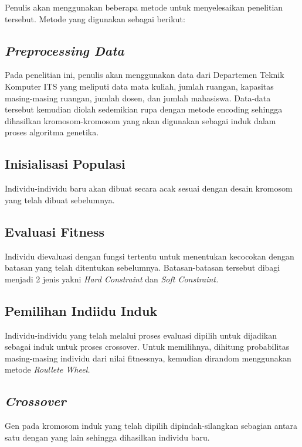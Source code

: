 Penulis akan menggunakan beberapa metode untuk menyelesaikan penelitian tersebut. 
Metode yang digunakan sebagai berikut:

\subsection{\emph{Preprocessing Data}}
  
  Pada penelitian ini, penulis akan menggunakan data dari Departemen Teknik Komputer ITS yang meliputi data mata kuliah, 
  jumlah ruangan, kapasitas masing-masing ruangan, jumlah dosen, dan jumlah mahasiswa. Data-data tersebut kemudian diolah 
  sedemikian rupa dengan metode encoding sehingga dihasilkan kromosom-kromosom yang akan digunakan sebagai induk dalam proses algoritma genetika.
  
\subsection{Inisialisasi Populasi}
  
  Individu-individu baru akan dibuat secara acak sesuai dengan desain kromosom yang telah dibuat sebelumnya.
  
  \subsection{Evaluasi Fitness}
  
  Individu dievaluasi dengan fungsi tertentu untuk menentukan kecocokan dengan batasan yang telah ditentukan sebelumnya. 
  Batasan-batasan tersebut dibagi menjadi 2 jenis yakni \emph{Hard Constraint} dan \emph{Soft Constraint.}
 
  \subsection{Pemilihan Indiidu Induk}
  
  Individu-individu yang telah melalui proses evaluasi dipilih untuk dijadikan sebagai induk untuk proses crossover. 
  Untuk memilihnya, dihitung probabilitas masing-masing individu dari nilai fitnessnya, kemudian dirandom menggunakan metode \emph{Roullete Wheel.}
 
  \subsection{\emph{Crossover}}
  
  Gen pada kromosom induk yang telah dipilih dipindah-silangkan sebagian antara satu dengan yang lain sehingga dihasilkan individu baru.

